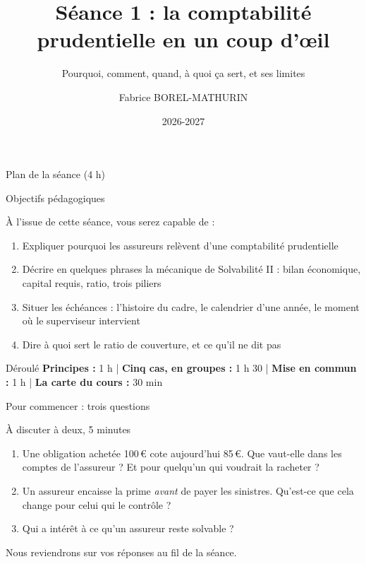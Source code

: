 \documentclass[10pt,aspectratio=169]{beamer}
\title[Séance 1 -- Panorama]{Séance 1 : la comptabilité prudentielle en un coup d'œil}
\subtitle{Pourquoi, comment, quand, à quoi ça sert, et ses limites}
\author[F. Borel-Mathurin]{Fabrice BOREL-MATHURIN}
\institute[ACPR-DEAR et SAF Lyon 1]{
    ACPR - DEAR\\
    et\\
    Laboratoire SAF Université Claude Bernard Lyon 1
}
\date{2026-2027}
\begin{document}
\frame{\titlepage}

\begin{frame}{Plan de la séance (4 h)}
\tableofcontents
\end{frame}

\begin{frame}{Objectifs pédagogiques}
\begin{block}{À l'issue de cette séance, vous serez capable de :}
\begin{enumerate}
  \item Expliquer pourquoi les assureurs relèvent d'une comptabilité prudentielle
  \item Décrire en quelques phrases la mécanique de Solvabilité II : bilan économique, capital requis, ratio, trois piliers
  \item Situer les échéances : l'histoire du cadre, le calendrier d'une année, le moment où le superviseur intervient
  \item Dire à quoi sert le ratio de couverture, et ce qu'il ne dit pas
\end{enumerate}
\end{block}
\vspace{0.3cm}
\begin{alertblock}{Déroulé}
\textbf{Principes :} 1 h \quad | \quad \textbf{Cinq cas, en groupes :} 1 h 30 \quad | \quad
\textbf{Mise en commun :} 1 h \quad | \quad \textbf{La carte du cours :} 30 min
\end{alertblock}
\end{frame}

\begin{frame}{Pour commencer : trois questions}
\begin{block}{À discuter à deux, 5 minutes}
\begin{enumerate}
  \item Une obligation achetée 100\,\euro{} cote aujourd'hui 85\,\euro. Que vaut-elle dans les
        comptes de l'assureur ? Et pour quelqu'un qui voudrait la racheter ?
  \item Un assureur encaisse la prime \emph{avant} de payer les sinistres. Qu'est-ce que cela
        change pour celui qui le contrôle ?
  \item Qui a intérêt à ce qu'un assureur reste solvable ?
\end{enumerate}
\end{block}
\vspace{0.2cm}
\small Nous reviendrons sur vos réponses au fil de la séance.
\end{frame}
\end{document}
